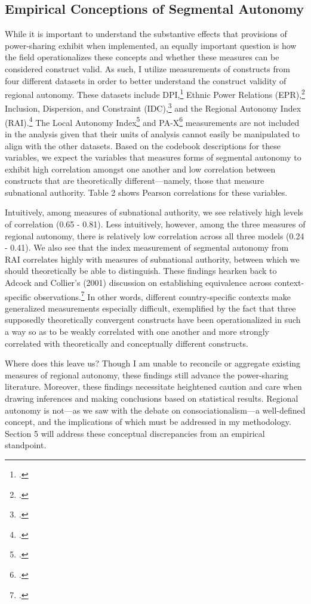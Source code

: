 \documentclass[12pt]{article}
\begin{document}
\subsection{Empirical Conceptions of Segmental Autonomy}
While it is important to understand the substantive effects that provisions of power-sharing exhibit when implemented, an equally important question is how the field operationalizes these concepts and whether these measures can be considered construct valid. As such, I utilize measurements of constructs from four different datasets in order to better understand the construct validity of regional autonomy. These datasets include DPI,\footcite{keefer_database_nodate} Ethnic Power Relations (EPR),\footcite{vogt_integrating_2015} Inclusion, Dispersion, and Constraint (IDC),\footcite{strom_inclusion_2017} and the Regional Autonomy Index (RAI).\footcite{hooghe_measuring_2016} The Local Autonomy Index\footcite{ladner_creating_2018} and PA-X\footcite{bell_introducing_2019} measurements are not included in the analysis given that their units of analysis cannot easily be manipulated to align with the other datasets. Based on the codebook descriptions for these variables, we expect the variables that measures forms of segmental autonomy to exhibit high correlation amongst one another and low correlation between constructs that are theoretically different---namely, those that measure subnational authority. Table 2 shows Pearson correlations for these variables.

Intuitively, among measures of subnational authority, we see relatively high levels of correlation (0.65 - 0.81). Less intuitively, however, among the three measures of regional autonomy, there is relatively low correlation across all three models (0.24 - 0.41). We also see that the index measurement of segmental autonomy from RAI correlates highly with measures of subnational authority, between which we should theoretically be able to distinguish. These findings hearken back to Adcock and Collier's (2001) discussion on establishing equivalence across context-specific observations.\footcite[534-535]{adcock_measurement_2001} In other words, different country-specific contexts make generalized measurements especially difficult, exemplified by the fact that three supposedly theoretically convergent constructs have been operationalized in such a way so as to be weakly correlated with one another and more strongly correlated with theoretically and conceptually different constructs.

Where does this leave us? Though I am unable to reconcile or aggregate existing measures of regional autonomy, these findings still advance the power-sharing literature. Moreover, these findings necessitate heightened caution and care when drawing inferences and making conclusions based on statistical results. Regional autonomy is not---as we saw with the debate on consociationalism---a well-defined concept, and the implications of which must be addressed in my methodology. Section 5 will address these conceptual discrepancies from an empirical standpoint. 
\end{document}
